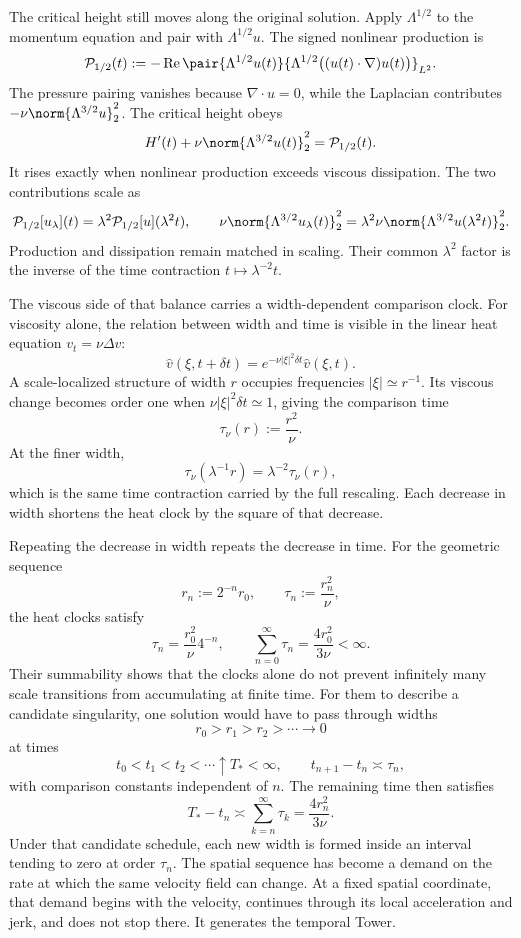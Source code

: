 
The critical height still moves along the original solution.
Apply \(\Lambda^{1/2}\) to the momentum equation and pair with \(\Lambda^{1/2}u\).
The signed nonlinear production is
\[
  \mathcal P_{1/2}(t)
  :=
  -\operatorname{Re}
  \pair
    {\Lambda^{1/2}u(t)}
    {\Lambda^{1/2}\bigl((u(t)\cdot\nabla)u(t)\bigr)}_{L^2}.
\]
The pressure pairing vanishes because \(\nabla\cdot u=0\), while the Laplacian contributes \(-\nu\norm{\Lambda^{3/2}u}_2^2\).
The critical height obeys
\[
  H'(t)
  +
  \nu\norm{\Lambda^{3/2}u(t)}_2^2
  =
  \mathcal P_{1/2}(t).
\]
It rises exactly when nonlinear production exceeds viscous dissipation.
The two contributions scale as
\[
  \mathcal P_{1/2}[u_\lambda](t)
  =
  \lambda^2\mathcal P_{1/2}[u](\lambda^2t),
  \qquad
  \nu\norm{\Lambda^{3/2}u_\lambda(t)}_2^2
  =
  \lambda^2\nu\norm{\Lambda^{3/2}u(\lambda^2t)}_2^2.
\]
Production and dissipation remain matched in scaling.
Their common \(\lambda^2\) factor is the inverse of the time contraction \(t\mapsto\lambda^{-2}t\).


The viscous side of that balance carries a width-dependent comparison clock.
For viscosity alone, the relation between width and time is visible in the linear heat equation \(v_t=\nu\Delta v\):
\[
  \widehat v(\xi,t+\delta t)
  =
  e^{-\nu|\xi|^2\delta t}\widehat v(\xi,t).
\]
A scale-localized structure of width \(r\) occupies frequencies \(|\xi|\simeq r^{-1}\).
Its viscous change becomes order one when \(\nu|\xi|^2\delta t\simeq1\), giving the comparison time
\[
  \tau_\nu(r)
  :=
  \frac{r^2}{\nu}.
\]
At the finer width,
\[
  \tau_\nu(\lambda^{-1}r)
  =
  \lambda^{-2}\tau_\nu(r),
\]
which is the same time contraction carried by the full \NavierStokes{} rescaling.
Each decrease in width shortens the heat clock by the square of that decrease.


Repeating the decrease in width repeats the decrease in time.
For the geometric sequence
\[
  r_n:=2^{-n}r_0,
  \qquad
  \tau_n:=\frac{r_n^2}{\nu},
\]
the heat clocks satisfy
\[
  \tau_n
  =
  \frac{r_0^2}{\nu}4^{-n},
  \qquad
  \sum_{n=0}^{\infty}\tau_n
  =
  \frac{4r_0^2}{3\nu}
  <
  \infty.
\]
Their summability shows that the clocks alone do not prevent infinitely many scale transitions from accumulating at finite time.
For them to describe a candidate singularity, one \NavierStokes{} solution would have to pass through widths
\[
  r_0>r_1>r_2>\cdots\longrightarrow0
\]
at times
\[
  t_0<t_1<t_2<\cdots\uparrow T_*<\infty,
  \qquad
  t_{n+1}-t_n\asymp\tau_n,
\]
with comparison constants independent of \(n\).
The remaining time then satisfies
\[
  T_*-t_n
  \asymp
  \sum_{k=n}^{\infty}\tau_k
  =
  \frac{4r_n^2}{3\nu}.
\]
Under that candidate schedule, each new width is formed inside an interval tending to zero at order \(\tau_n\).
The spatial sequence has become a demand on the rate at which the same velocity field can change.
At a fixed spatial coordinate, that demand begins with the velocity, continues through its local acceleration and jerk, and does not stop there.
It generates the temporal Tower.
